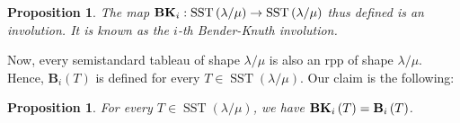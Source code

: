 \documentclass[12pt]{article}
\theoremstyle{plain}
\newtheorem{proposition}[theorem]{Proposition}
\theoremstyle{definition}
\def\lm{{\lambda/\mu}}
\begin{document}
%

\begin{proposition}
\label{prop.BKclassical}The map ${\mathbf{BK}}_{i}:\operatorname*{SST}\left(  \lambda
/\mu\right)  \rightarrow\operatorname*{SST}\left(  \lambda/\mu\right)  $ thus
defined is an involution. It is known as the $i$\textit{-th Bender-Knuth
involution}.
\end{proposition}

Now, every semistandard tableau of shape $\lm$ is
also an rpp of shape $\lm$. Hence, $\mathbf{B}_{i}\left(  T\right)  $ is
defined for every $T\in\operatorname*{SST}\left(  \lambda/\mu\right)  $. Our claim is the following:

\begin{proposition}
\label{prop.BK=BK}For every $T\in\operatorname*{SST}\left(  \lambda
/\mu\right)  $, we have ${\mathbf{BK}}_{i}\left(  T\right)  =\mathbf{B}_{i}\left(
T\right)  $.
\end{proposition}
\end{document}
